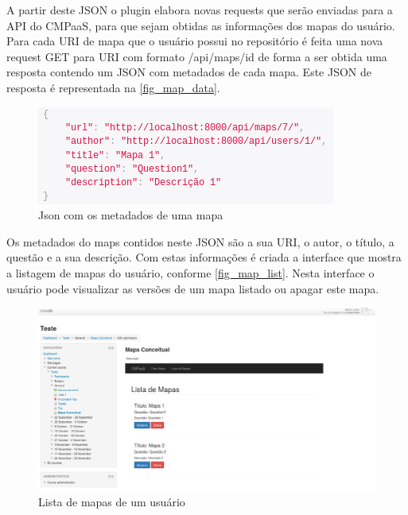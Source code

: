 \documentclass[
	12pt,				%
	openright,			%
	oneside,			%
	a4paper,			%
	english,			%
	french,				%
	spanish,			%
	brazil				%
	]{abntex2}
\begin{document}
A partir deste JSON o plugin elabora novas requests que serão enviadas para a API do CMPaaS, para que sejam obtidas as informações dos mapas do usuário. Para cada URI de mapa que o usuário possui no repositório é feita uma nova request GET para URI com formato /api/maps/id de forma a ser obtida uma resposta contendo um JSON com metadados de cada mapa. Este JSON de resposta é representada na \autoref{fig_map_data}.

\begin{figure}[htb]
	\caption{\label{fig_map_data} Json com os metadados de uma mapa}
	\begin{center}
		\includegraphics[scale=0.6]{map_data.png}
	\end{center}
\end{figure}

Os metadados do maps contidos neste JSON são a sua URI, o autor, o título, a questão e a sua descrição. Com estas informações é criada a interface que mostra a listagem de mapas do usuário, conforme \autoref{fig_map_list}. Nesta interface o usuário pode visualizar as versões de um mapa listado ou apagar este mapa.

\begin{figure}[htb]
	\caption{\label{fig_map_list} Lista de mapas de um usuário}
	\begin{center}
		\includegraphics[scale=0.2]{map_list.png}
	\end{center}
\end{figure}
\end{document}
